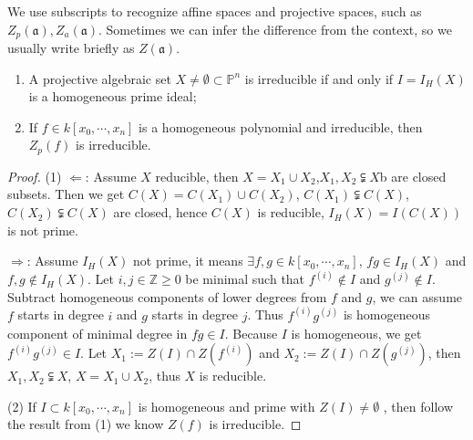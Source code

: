 \begin{remark}
	We use subscripts to recognize affine spaces and projective spaces, such as $ Z_p(\mathfrak{a}),Z_a(\mathfrak{a}) $. Sometimes we can infer the difference from the context, so we usually write briefly as $ Z(\mathfrak{a}) $.
\end{remark}
\begin{proposition}{}
  \noindent
	\begin{enumerate}
		\item A projective algebraic set $ X\neq \emptyset\subset \mathbb{P}^n $ is irreducible if and only if $ I=I_H(X) $ is a homogeneous prime ideal;
		\item If $ f\in k[x_0,\cdots,x_n] $ is a homogeneous polynomial and irreducible, then $ Z_p(f) $ is irreducible.
	\end{enumerate}
\end{proposition}
\begin{proof}
	(1) $ \Leftarrow $: Assume $ X $ reducible, then $ X=X_1\cup X_2 $,$ X_1,X_2\subsetneqq X $b are closed subsets. Then we get $ C(X)=C(X_1)\cup C(X_2) $, $ C(X_1)\subsetneqq C(X) $,$ C(X_2)\subsetneqq C(X) $ are closed, hence  $ C(X) $ is reducible, $ I_H(X)=I(C(X)) $ is not prime.

	$ \Rightarrow $: Assume $ I_H(X) $ not prime, it means $ \exists f,g\in k[x_0,\cdots,x_n] $, $ fg\in I_H(X) $ and $ f,g\not\in I_H(X) $. Let $ i,j\in\mathbb{Z}\geq 0 $ be minimal such that $ f^{(i)}\not\in I $ and $ g^{(j)}\not\in I $. Subtract homogeneous components of lower degrees from $ f $ and $ g $, we can assume $ f $ starts in degree $ i $ and $ g $ starts in degree $ j $. Thus $ f^{(i)}g^{(j)} $  is homogeneous component of minimal degree in $ fg\in I $. Because $ I $ is homogeneous,  we get $ f^{(i)}g^{(j)} \in I$. Let
	$ X_1:=Z(I)\cap Z(f^(i)) $ and $ X_2:=Z(I)\cap Z(g^{(j)}) $, then $ X_1,X_2\subsetneqq X $, $ X=X_1\cup X_2 $, thus $ X $ is reducible.

	(2) If $ I\subset k[x_0,\cdots,x_n] $ is homogeneous and prime with $ Z(I)\neq\emptyset $ , then follow the result from (1) we know $ Z(f) $ is irreducible.
\end{proof}

